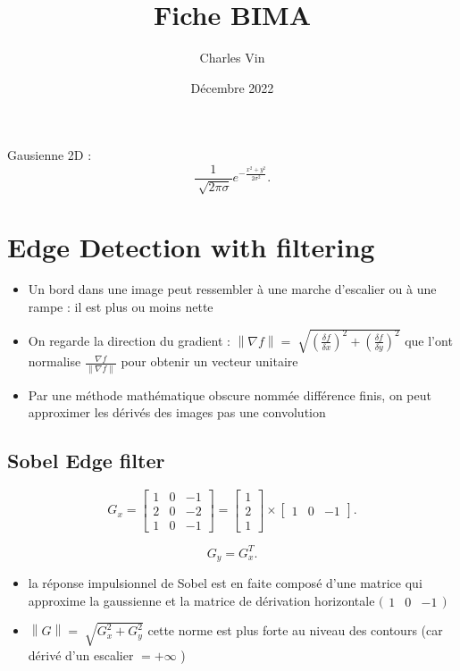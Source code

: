 \documentclass{article}
\title{Fiche BIMA}
\author{Charles Vin}
\date{Décembre 2022}
\theoremstyle{plain}%
\theoremstyle{definition}
\theoremstyle{remark}
\begin{document}
\maketitle
\tableofcontents
Gausienne 2D : 
\[
    \frac{1}{\sqrt[]{2 \pi \sigma }} e^{- \frac{x^2 + y^2}{2 \sigma ^2}}
.\]

\section{Edge Detection with filtering}
\begin{itemize}
    \item Un bord dans une image peut ressembler à une marche d'escalier ou à une rampe : il est plus ou moins nette
    \item On regarde la direction du gradient : $ \left\| \nabla f \right\| = \sqrt[]{(\frac{\delta f}{\delta x})^2 + (\frac{\delta f}{\delta y})^2} $ que l'ont normalise $ \frac{\nabla f}{\left\| \nabla f \right\| } $ pour obtenir un vecteur unitaire
    \item Par une méthode mathématique obscure nommée différence finis, on peut approximer les dérivés des images pas une convolution 
\end{itemize}
\subsection{Sobel Edge filter}
\[
    G_x = \begin{bmatrix}
        1 & 0 & -1 \\
        2 & 0 & -2 \\
        1 & 0 & -1 
    \end{bmatrix} = \begin{bmatrix}
        1 \\
        2 \\
        1
    \end{bmatrix} \times \begin{bmatrix}
        1 & 0 & -1
    \end{bmatrix}
.\]

\[
    G_y = G_x^T
.\]


\begin{itemize}
    \item la réponse impulsionnel de Sobel est en faite composé d'une matrice qui approxime la gaussienne et la matrice de dérivation horizontale $ \big(\begin{smallmatrix}
        1 & 0 & -1
    \end{smallmatrix}\big) $ 
    \item $ \left\| G \right\| = \sqrt[]{G_x^2 + G_y^2} $ cette norme est plus forte au niveau des contours (car dérivé d'un escalier $ = + \infty  $ )
\end{itemize}
\end{document}

